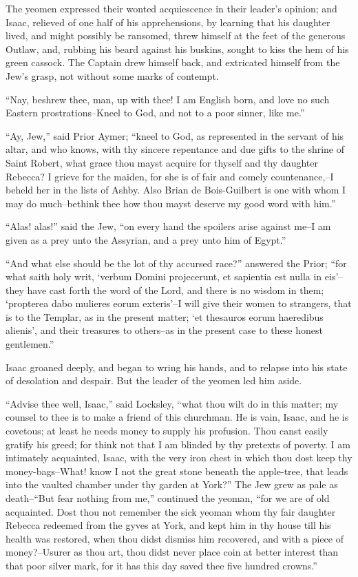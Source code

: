 The yeomen expressed their wonted acquiescence in their leader's
opinion; and Isaac, relieved of one half of his apprehensions, by
learning that his daughter lived, and might possibly be ransomed, threw
himself at the feet of the generous Outlaw, and, rubbing his beard
against his buskins, sought to kiss the hem of his green cassock. The
Captain drew himself back, and extricated himself from the Jew's grasp,
not without some marks of contempt.

``Nay, beshrew thee, man, up with thee! I am English born, and love no
such Eastern prostrations--Kneel to God, and not to a poor sinner, like
me.''

``Ay, Jew,'' said Prior Aymer; ``kneel to God, as represented in the
servant of his altar, and who knows, with thy sincere repentance and due
gifts to the shrine of Saint Robert, what grace thou mayst acquire for
thyself and thy daughter Rebecca? I grieve for the maiden, for she is of
fair and comely countenance,--I beheld her in the lists of Ashby. Also
Brian de Bois-Guilbert is one with whom I may do much--bethink thee how
thou mayst deserve my good word with him.''

``Alas! alas!'' said the Jew, ``on every hand the spoilers arise against
me--I am given as a prey unto the Assyrian, and a prey unto him of
Egypt.''

``And what else should be the lot of thy accursed race?'' answered the
Prior; ``for what saith holy writ, `verbum Domini projecerunt, et
sapientia est nulla in eis'--they have cast forth the word of the Lord,
and there is no wisdom in them; `propterea dabo mulieres eorum
exteris'--I will give their women to strangers, that is to the Templar,
as in the present matter; `et thesauros eorum haeredibus alienis', and
their treasures to others--as in the present case to these honest
gentlemen.''

Isaac groaned deeply, and began to wring his hands, and to relapse into
his state of desolation and despair. But the leader of the yeomen led
him aside.

``Advise thee well, Isaac,'' said Locksley, ``what thou wilt do in this
matter; my counsel to thee is to make a friend of this churchman. He is
vain, Isaac, and he is covetous; at least he needs money to supply his
profusion. Thou canst easily gratify his greed; for think not that I am
blinded by thy pretexts of poverty. I am intimately acquainted, Isaac,
with the very iron chest in which thou dost keep thy money-bags--What!
know I not the great stone beneath the apple-tree, that leads into the
vaulted chamber under thy garden at York?'' The Jew grew as pale as
death--``But fear nothing from me,'' continued the yeoman, ``for we are
of old acquainted. Dost thou not remember the sick yeoman whom thy fair
daughter Rebecca redeemed from the gyves at York, and kept him in thy
house till his health was restored, when thou didst dismiss him
recovered, and with a piece of money?--Usurer as thou art, thou didst
never place coin at better interest than that poor silver mark, for it
has this day saved thee five hundred crowns.''

